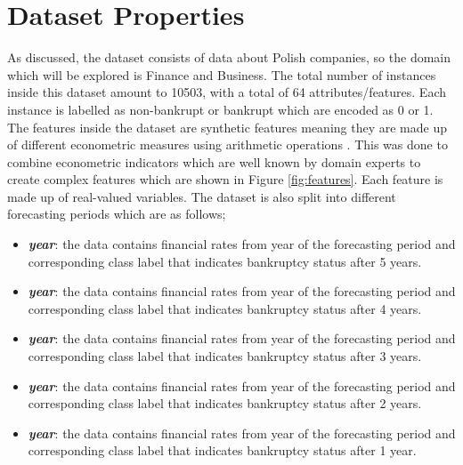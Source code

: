 \section{Dataset Properties}\label{ssec:datasetprop}

As discussed, the dataset consists of data about Polish companies, so the domain which will be explored is Finance and Business. The total number of instances inside this dataset amount to 10503, with a total of 64 attributes/features. Each instance is labelled as non-bankrupt or bankrupt which are encoded as 0 or 1. The features inside the dataset are synthetic features meaning they are made up of different econometric measures using arithmetic operations \cite{saisree:github}. This was done to combine econometric indicators which are well known by domain experts to create complex features which are shown in Figure \ref{fig:features}. Each feature is made up of real-valued variables. The dataset is also split into different forecasting periods which are as follows;
\vspace{-3mm}
\begin{itemize}
    \itemsep0em 
  \item \textbf{\textit{ year}}: the data contains financial rates from  year of the forecasting period and corresponding class label that indicates bankruptcy status after 5 years.
  \item  \textbf{\textit{ year}}: the data contains financial rates from  year of the forecasting period and corresponding class label that indicates bankruptcy status after 4 years.
  \item \textbf{\textit{ year}}: the data contains financial rates from  year of the forecasting period and corresponding class label that indicates bankruptcy status after 3 years.
  \item \textbf{\textit{ year}}: the data contains financial rates from  year of the forecasting period and corresponding class label that indicates bankruptcy status after 2 years.
  \item \textbf{\textit{ year}}: the data contains financial rates from  year of the forecasting period and corresponding class label that indicates bankruptcy status after 1 year. 
\end{itemize}

